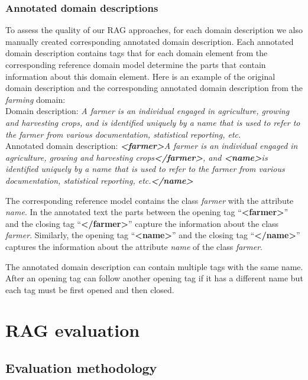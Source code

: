 \subsubsection{Annotated domain descriptions}

To assess the quality of our RAG approaches, for each domain description we also manually created corresponding annotated domain description. Each annotated domain description contains tags that for each domain element from the corresponding reference domain model determine the parts that contain information about this domain element. Here is an example of the original domain description and the corresponding annotated domain description from the \emph{farming} domain: \\

\noindent{}Domain description: \textit{A farmer is an individual engaged in agriculture, growing and harvesting crops, and is identified uniquely by a name that is used to refer to the farmer from various documentation, statistical reporting, etc.} \\

\noindent{}Annotated domain description: \textit{\textbf{<farmer>}A farmer is an individual engaged in agriculture, growing and harvesting crops\textbf{</farmer>}, and \textbf{<name>}is identified uniquely by a name that is used to refer to the farmer from various documentation, statistical reporting, etc.\textbf{</name>}}

The corresponding reference model contains the class \textit{farmer} with the attribute \textit{name}. In the annotated text the parts between the opening tag ``\textbf{<farmer>}'' and the closing tag ``\textbf{</farmer>}'' capture the information about the class \textit{farmer}. Similarly, the opening tag ``\textbf{<name>}'' and the closing tag ``\textbf{</name>}'' captures the information about the attribute \textit{name} of the class \textit{farmer}.

The annotated domain description can contain multiple tags with the same name. After an opening tag can follow another opening tag if it has a different name but each tag must be first opened and then closed.


\section{RAG evaluation}
\label{sec:filtering_evaluation}

\subsection{Evaluation methodology}

